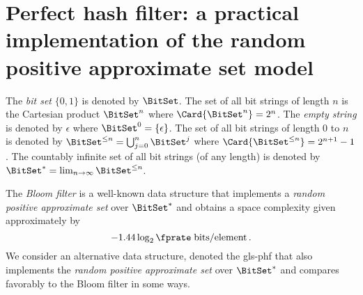 \documentclass[ ../main.tex]{subfiles}
\begin{document}
\section{Perfect hash filter: a practical implementation of the random positive approximate set model}
\label{sec:phf}
\begin{notation}
The \emph{bit set} $\{0,1\}$ is denoted by $\BitSet$. The set of all bit strings of length $n$ is the Cartesian product $\BitSet^n$ where $\Card{\BitSet^n} = 2^n$. The \emph{empty string} is denoted by $\epsilon$ where $\BitSet^0 = \{\epsilon\}$. The set of all bit strings of length $0$ to $n$ is denoted by $\BitSet^{\leq n} = \bigcup_{j=0}^{n} \BitSet^j$ where $\Card{\BitSet^{\leq n}} = 2^{n+1} - 1$. The countably infinite set of all bit strings (of any length) is denoted by $\BitSet^{*} = \lim_{n \to \infty} \BitSet^{\leq n}$.
\end{notation}

The \emph{Bloom filter}\cite{bf} is a well-known data structure that implements a \emph{random positive approximate set} over $\BitSet^{*}$ and obtains a space complexity given approximately by
\begin{equation}
    -1.44 \log_2 \fprate \; \si{bits \per element}\,.
\end{equation}
We consider an alternative data structure, denoted the \gls{gls-phf} that also implements the \emph{random positive approximate set} over $\BitSet^*$ and compares favorably to the Bloom filter in some ways.
\end{document}

